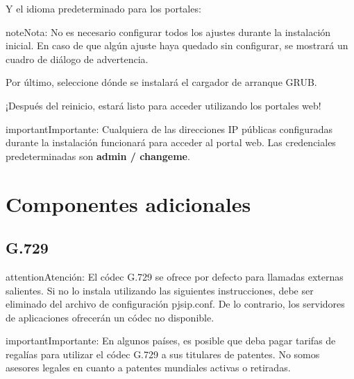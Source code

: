 \documentclass[letterpaper,10pt,spanish]{sphinxmanual}
\begin{document}
Y el idioma predeterminado para los portales:

\noindent{}

\begin{notice}{note}{Nota:}
No es necesario configurar todos los ajustes durante la instalación inicial. En caso de que algún ajuste haya quedado sin configurar, se mostrará un cuadro de diálogo de advertencia.
\end{notice}

\noindent{}

Por último, seleccione dónde se instalará el cargador de arranque GRUB.

\noindent{}

¡Después del reinicio, estará listo para acceder utilizando los portales web!

\begin{notice}{important}{Importante:}
Cualquiera de las direcciones IP públicas configuradas durante la instalación funcionará para acceder al portal web. Las credenciales predeterminadas son \textbf{admin / changeme}.
\end{notice}


\section{Componentes adicionales}
\label{basic_concepts/installation/extra_components::doc}\label{basic_concepts/installation/extra_components:extra-components}

\subsection{G.729}
\label{basic_concepts/installation/extra_components:g-729}
\begin{notice}{attention}{Atención:}
El códec G.729 se ofrece por defecto para llamadas externas salientes. Si no lo instala utilizando las siguientes instrucciones, debe ser eliminado del archivo de configuración pjsip.conf. De lo contrario, los servidores de aplicaciones ofrecerán un códec no disponible.
\end{notice}

\begin{notice}{important}{Importante:}
En algunos países, es posible que deba pagar tarifas de regalías para utilizar el códec G.729 a sus titulares de patentes. No somos asesores legales en cuanto a patentes mundiales activas o retiradas.
\end{notice}
\end{document}
